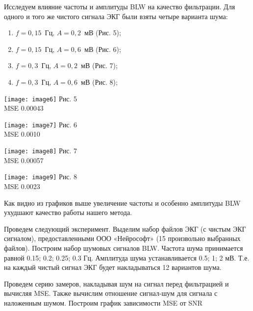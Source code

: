 \documentclass[10pt,a5paper]{article}
\numberwithin{figure}{section}
\numberwithin{table}{section}
\begin{document}
Исследуем влияние частоты и амплитуды BLW на качество фильтрации.
Для одного и того же чистого сигнала ЭКГ были взяты четыре варианта шума:
\begin{enumerate}
  \item $f=0{,}15$~Гц, $A=0{,}2$~мВ (Рис. 5);
  \item $f=0{,}15$~Гц, $A=0{,}6$~мВ (Рис. 6);
  \item $f=0{,}3$~Гц, $A=0{,}2$~мВ (Рис. 7);
  \item $f=0{,}3$~Гц, $A=0{,}6$~мВ (Рис. 8);
\end{enumerate}

\noindent
\begin{minipage}[t]{0.48\textwidth}
    \centering
    \texttt{[image: image6]}
    \centering Рис. 5\\MSE 0.00043
    \label{fig:image6}
\end{minipage}
\hfill
\begin{minipage}[t]{0.48\textwidth}
    \centering
    \texttt{[image: image7]}
    \centering Рис. 6\\MSE 0.0010
    \label{fig:image7}
\end{minipage}

\noindent
\begin{minipage}[t]{0.48\textwidth}
    \centering
    \texttt{[image: image8]}
    \centering Рис. 7\\MSE 0.00057
    \label{fig:image8}
\end{minipage}
\hfill
\begin{minipage}[t]{0.48\textwidth}
    \centering
    \texttt{[image: image9]}
    \centering Рис. 8\\MSE 0.0023
    \label{fig:image9}
\end{minipage}
\medskip

Как видно из графиков выше увеличение частоты и особенно амплитуды BLW ухудшают качество работы нашего метода.
 
Проведем следующий эксперимент. Выделим набор файлов ЭКГ (с чистым ЭКГ сигналом), предоставленными ООО «Нейрософт» (15 произвольно выбранных файлов). Построим набор шумовых сигналов BLW. Частота шума принимается равной 0.15; 0.2; 0.25; 0.3 Гц. Амплитуда шума устанавливается 0.5; 1; 2 мВ. Т.е. на каждый чистый сигнал ЭКГ будет накладываться 12 вариантов шума.

Проведем серию замеров, накладывая шум на сигнал перед фильтрацией и вычисляя MSE. Также вычислим отношение сигнал-шум для сигнала с наложенным шумом. Построим график зависимости MSE от SNR
\end{document}
